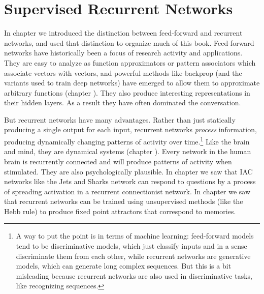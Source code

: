 \chapter{Supervised Recurrent Networks}\label{ch_supervised_recurrent}

In chapter  we introduced the distinction between feed-forward and recurrent networks, and used that distinction to organize much of this book. Feed-forward networks have historically been a focus of research activity and applications. They are easy to analyze as function approximators or pattern associators which  associate vectors with vectors, and powerful methods like backprop (and the variants used to train deep networks) have emerged to allow them to approximate arbitrary functions (chapter ). They also produce interesting representations in their hidden layers. As a  result they have often dominated the conversation.

But recurrent networks have many advantages. Rather than just statically producing a single output for each input, recurrent networks \emph{process} information, producing dynamically changing patterns of activity over time.\footnote{A way to put the point is in terms of machine learning: feed-forward models tend to be discriminative models, which just  classify inputs and in a sense discriminate them from each other, while recurrent networks are generative models, which can generate long complex sequences. But this is a bit misleading because recurrent networks are also used in discriminative tasks, like recognizing sequences.} Like the brain and mind, they are dynamical systems (chapter ). Every network in the human brain is recurrently connected and will produce patterns of activity when stimulated. They are also psychologically plausible. In  chapter  we saw that IAC networks like the Jets and Sharks network can respond to questions by a process of spreading activation in a recurrent connectionist network. In chapter  we saw that recurrent networks can be trained using unsupervised methods (like the Hebb rule) to produce fixed point attractors that correspond to memories. 

